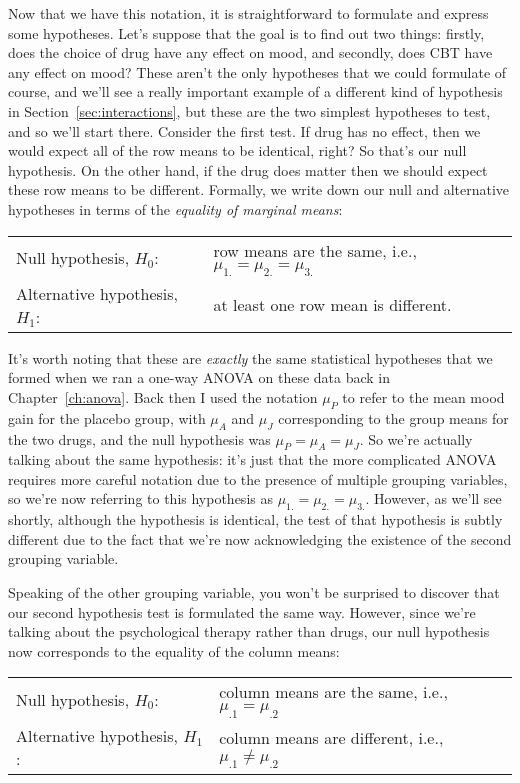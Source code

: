 Now that we have this notation, it is straightforward to formulate and express some hypotheses. Let's suppose that the goal is to find out two things: firstly, does the choice of drug have any effect on mood, and secondly, does CBT have any effect on mood? These aren't the only hypotheses that we could formulate of course, and we'll see a really important example of a different kind of hypothesis in Section~\ref{sec:interactions}, but these are the two simplest hypotheses to test, and so we'll start there. Consider the first test. If drug has no effect, then we would expect all of the row means to be identical, right? So that's our null hypothesis. On the other hand, if the drug does matter then we should expect these row means to be different. Formally, we write down our null and alternative hypotheses in terms of the {\it equality of marginal means}:
\begin{center}
\begin{tabular}{ll}
Null hypothesis, $H_0$: & row means are the same, i.e., $\mu_{1.} = \mu_{2.} = \mu_{3.}$ \\
Alternative hypothesis, $H_1$: & at least one row mean is different.
\end{tabular}
\end{center}
It's worth noting that these are {\it exactly} the same statistical hypotheses that we formed when we ran a one-way ANOVA on these data back in Chapter~\ref{ch:anova}. Back then I used the notation $\mu_P$ to refer to the mean mood gain for the placebo group, with $\mu_A$ and $\mu_J$ corresponding to the group means for the two drugs, and the null hypothesis was $\mu_P = \mu_A = \mu_J$. So we're actually talking about the same hypothesis: it's just that the more complicated ANOVA requires more careful notation due to the presence of multiple grouping variables, so we're now referring to this hypothesis as $\mu_{1.} = \mu_{2.} = \mu_{3.}$. However, as we'll see shortly, although the hypothesis is identical, the test of that hypothesis is subtly different due to the fact that we're now acknowledging the existence of the second grouping variable.

Speaking of the other grouping variable, you won't be surprised to discover that our second hypothesis test is formulated the same way. However, since we're talking about the psychological therapy rather than drugs, our null hypothesis now corresponds to the equality of the column means:
\begin{center}
\begin{tabular}{ll}
Null hypothesis, $H_0$: & column means are the same, i.e., $\mu_{.1} = \mu_{.2}$ \\
Alternative hypothesis, $H_1$: & column means are different, i.e., $\mu_{.1} \neq \mu_{.2}$
\end{tabular}
\end{center}



